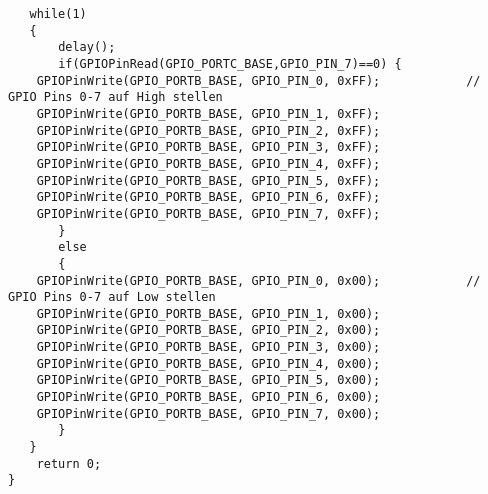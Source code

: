 \begin{lstlisting}
   while(1)
   {
       delay();
       if(GPIOPinRead(GPIO_PORTC_BASE,GPIO_PIN_7)==0) {
    GPIOPinWrite(GPIO_PORTB_BASE, GPIO_PIN_0, 0xFF);            // GPIO Pins 0-7 auf High stellen
    GPIOPinWrite(GPIO_PORTB_BASE, GPIO_PIN_1, 0xFF);
    GPIOPinWrite(GPIO_PORTB_BASE, GPIO_PIN_2, 0xFF);
    GPIOPinWrite(GPIO_PORTB_BASE, GPIO_PIN_3, 0xFF);
    GPIOPinWrite(GPIO_PORTB_BASE, GPIO_PIN_4, 0xFF);
    GPIOPinWrite(GPIO_PORTB_BASE, GPIO_PIN_5, 0xFF);
    GPIOPinWrite(GPIO_PORTB_BASE, GPIO_PIN_6, 0xFF);
    GPIOPinWrite(GPIO_PORTB_BASE, GPIO_PIN_7, 0xFF);
       }
       else
       {
    GPIOPinWrite(GPIO_PORTB_BASE, GPIO_PIN_0, 0x00);            // GPIO Pins 0-7 auf Low stellen
    GPIOPinWrite(GPIO_PORTB_BASE, GPIO_PIN_1, 0x00);
    GPIOPinWrite(GPIO_PORTB_BASE, GPIO_PIN_2, 0x00);
    GPIOPinWrite(GPIO_PORTB_BASE, GPIO_PIN_3, 0x00);
    GPIOPinWrite(GPIO_PORTB_BASE, GPIO_PIN_4, 0x00);
    GPIOPinWrite(GPIO_PORTB_BASE, GPIO_PIN_5, 0x00);
    GPIOPinWrite(GPIO_PORTB_BASE, GPIO_PIN_6, 0x00);
    GPIOPinWrite(GPIO_PORTB_BASE, GPIO_PIN_7, 0x00);
       }
   }
    return 0;
}
\end{lstlisting}



\subsubsection{}

